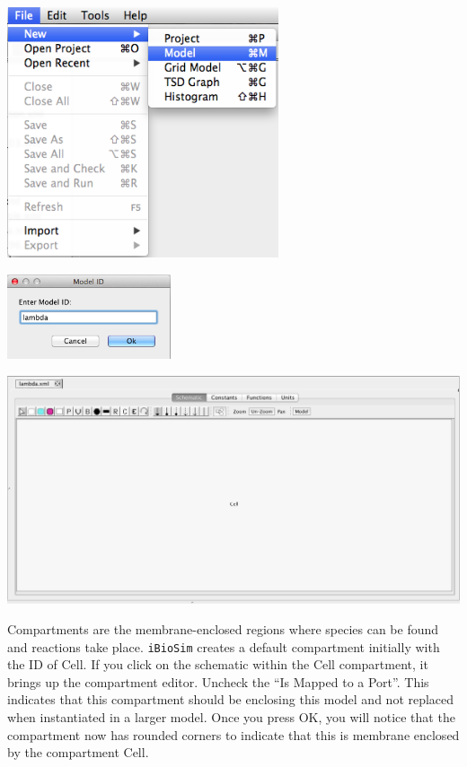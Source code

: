 \documentclass[titlepage,11pt]{article}
\begin{document}
\begin{center}
\includegraphics[width=80mm]{screenshots/newModel}
\end{center}

\begin{center}
\includegraphics[height=25mm]{screenshots/ModelId}
\end{center}

\begin{center}
\includegraphics[width=160mm]{screenshots/ModelEditor}
\end{center}

Compartments are the membrane-enclosed regions where species can be found and reactions take place.  {\tt iBioSim} creates a default compartment initially with the ID of Cell.  If you click on the schematic within the Cell compartment, it brings up the compartment editor.  Uncheck the ``Is Mapped to a Port''.  This indicates that this compartment should be enclosing this model and not replaced when instantiated in a larger model.  Once you press OK, you will notice that the compartment now has rounded corners to indicate that this is membrane enclosed by the compartment Cell.
\end{document}
